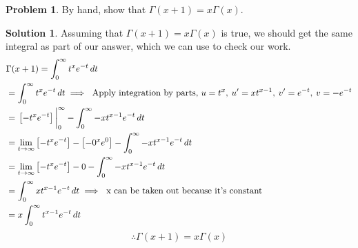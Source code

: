 \documentclass[10pt]{article}
\theoremstyle{definition}
\newtheorem{problem}{Problem}
\newtheorem{soln}{Solution}
\begin{document}
\newpage

\begin{problem}
By hand, show that $\Gamma(x + 1) = x\Gamma(x)$.
\end{problem}
\begin{soln} Assuming that $\Gamma(x + 1) = x\Gamma(x)$ is true, we should get the same integral as part of our answer, which we can use to check our work.
    \begin{align*}
         & \Gamma(x + 1) = \int_{0}^{\infty} t^{x}e^{-t} \,dt                                                                                                      \\
         & = \int_{0}^{\infty} t^{x}e^{-t} \,dt \implies \text{ Apply integration by parts, } u = t^x, \: u^{\prime}= xt^{x-1}, \: v^{\prime}=e^{-t}, \: v=-e^{-t} \\
         & = \evaluated{\left[-t^xe^{-t}\right]}_{0}^{\infty}-\int_{0}^{\infty} -xt^{x-1}e^{-t} \,dt                                                               \\
         & = \lim_{t \to \infty}  \left[-t^xe^{-t}\right]-\left[-0^xe^{0}\right]-\int_{0}^{\infty} -xt^{x-1}e^{-t} \,dt                                            \\
         & = \lim_{t \to \infty}  \left[-t^xe^{-t}\right]-0-\int_{0}^{\infty} -xt^{x-1}e^{-t} \,dt                                                                 \\
         & = \int_{0}^{\infty} xt^{x-1}e^{-t} \,dt \implies \text{ x can be taken out because it's constant }                                                      \\
         & = x\int_{0}^{\infty} t^{x-1}e^{-t} \,dt                                                                                                                 \\
    \end{align*}
    $$\therefore \Gamma(x + 1) = x\Gamma(x) $$
\end{soln}
\end{document}

